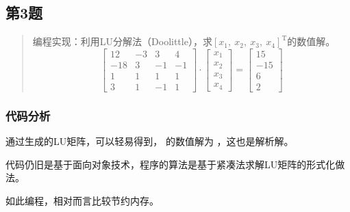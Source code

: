 \subsection{第3题}
\begin{quote}
    {\kaishu
        编程实现：利用LU分解法（Doolittle），求$[x_1,\ x_2,\ x_3,\ x_4]^\mathrm{T}$的数值解。
    }
    \begin{equation}
        \left[ \begin{array}{rrrr}
            {12} & {-3} & {3} & {4} \\ {-18} & {3} & {-1} & {-1} \\ {1} & {1} & {1} & {1} \\ {3} & {1} & {-1} & {1}
        \end{array}\right] \cdot \left[ \begin{array}{c}{x_{1}} \\ {x_{2}} \\ {x_{3}} \\ {x_{4}}\end{array}\right]=\left[ \begin{array}{r}{15} \\ {-15} \\ {6} \\ {2}\end{array}\right]
    \end{equation}
\end{quote}

\subsubsection{代码分析}

通过生成的LU矩阵，可以轻易得到， 的数值解为 ，这也是解析解。

代码仍旧是基于面向对象技术，程序的算法是基于紧凑法求解LU矩阵的形式化做法。

如此编程，相对而言比较节约内存。

